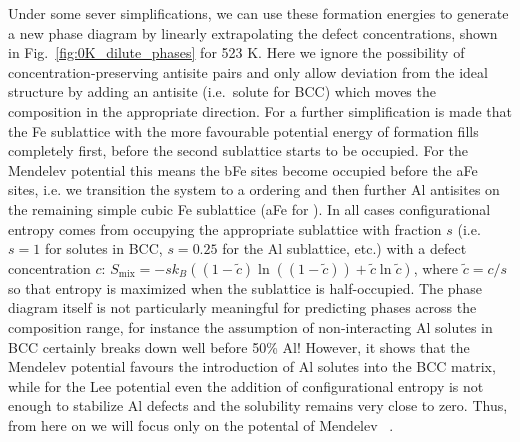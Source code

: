 Under some sever simplifications, we can use these formation energies to generate a new phase diagram by linearly extrapolating the defect concentrations, shown in Fig.~\ref{fig:0K_dilute_phases} for 523 K.
Here we ignore the possibility of concentration-preserving antisite pairs and only allow deviation from the ideal structure by adding an antisite (i.e.~solute for BCC) which moves the composition in the appropriate direction.
For \DOTHREE a further simplification is made that the Fe sublattice with the more favourable potential energy of formation fills completely first, before the second sublattice starts to be occupied.
For the Mendelev potential this means the bFe sites become occupied before the aFe sites, i.e. we transition the system to a \BTWO ordering and then further Al antisites on the remaining simple cubic Fe sublattice (aFe for \DOTHREE).
In all cases configurational entropy comes from occupying the appropriate sublattice with fraction $s$ (i.e.~$s=1$ for solutes in BCC, $s=0.25$ for the \DOTHREE Al sublattice, etc.) with a defect concentration $c$: $S_\mathrm{mix} = -s k_B ((1 - \tilde{c}) \ln((1 - \tilde{c})) + \tilde{c}\ln\tilde{c})$, where $\tilde{c} = c/s$ so that entropy is maximized when the sublattice is half-occupied.
The phase diagram itself is not particularly meaningful for predicting phases across the composition range, for instance the assumption of non-interacting Al solutes in BCC certainly breaks down well before 50\% Al! However, it shows that the Mendelev potential favours the introduction of Al solutes into the BCC matrix, while for the Lee potential even the addition of configurational entropy is not enough to stabilize Al defects and the solubility remains very close to zero.
Thus, from here on we will focus only on the potental of Mendelev \etal~\cite{mendelev2005effect}.
%
